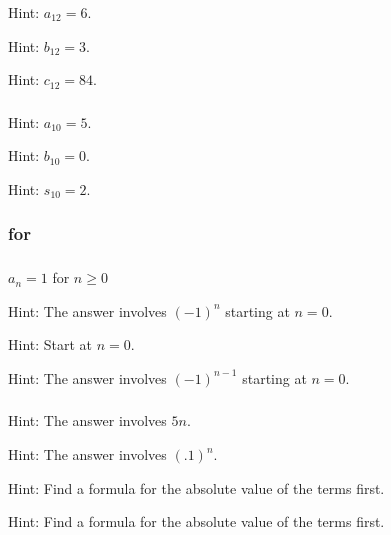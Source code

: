 \subsubsection*{ \answers}
\begin{apart}
    \item Hint: $a_{12} = 6$.
    \item Hint: $b_{12} = 3$.
    \item Hint: $c_{12} = 84$.
\end{apart}

\subsubsection*{ \answers}
\begin{apart}
    \item Hint: $a_{10}=5$.
    \item Hint: $b_{10} = 0$.
    \item Hint: $s_{10}=2$.
\end{apart}

\subsubsection{\answers for  \submodelseq}

\subsubsection*{ \answers}
\begin{apart}
    \item $a_n=1$ for $n \ge 0$
    \item Hint: The answer involves $(-1)^n$ starting at $n=0$.
    \item Hint: Start at $n=0$.
    \item Hint: The answer involves $(-1)^{n-1}$ starting at $n=0$.
\end{apart}

\subsubsection*{ \answers}
\begin{apart}
    \item Hint: The answer involves $5n$.
    \item Hint: The answer involves $(.1)^n$.
    \item Hint: Find a formula for the absolute value of the terms first.
    \item Hint: Find a formula for the absolute value of the terms first.
\end{apart}


